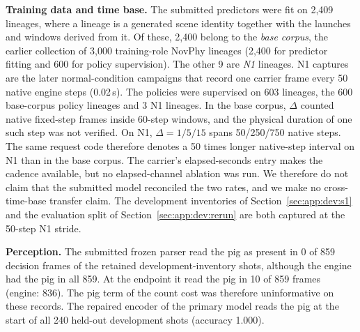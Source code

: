 \begin{revblock}
\textbf{Training data and time base.} The submitted predictors were fit on 2,409 lineages, where a lineage is a generated scene identity together with the launches and windows derived from it. Of these, 2,400 belong to the \emph{base corpus}, the earlier collection of 3,000 training-role NovPhy lineages (2,400 for predictor fitting and 600 for policy supervision). The other 9 are \emph{N1} lineages. N1 captures are the later normal-condition campaigns that record one carrier frame every 50 native engine steps (0.02\,s). The policies were supervised on 603 lineages, the 600 base-corpus policy lineages and 3 N1 lineages. In the base corpus, $\Delta$ counted native fixed-step frames inside 60-step windows, and the physical duration of one such step was not verified. On N1, $\Delta=1/5/15$ spans 50/250/750 native steps. The same request code therefore denotes a 50 times longer native-step interval on N1 than in the base corpus. The carrier's elapsed-seconds entry makes the cadence available, but no elapsed-channel ablation was run. We therefore do not claim that the submitted model reconciled the two rates, and we make no cross-time-base transfer claim. The development inventories of Section~\ref{sec:app:dev:s1} and the evaluation split of Section~\ref{sec:app:dev:rerun} are both captured at the 50-step N1 stride.

\textbf{Perception.} The submitted frozen parser read the pig as present in 0 of 859 decision frames of the retained development-inventory shots, although the engine had the pig in all 859. At the endpoint it read the pig in 10 of 859 frames (engine: 836). The pig term of the count cost was therefore uninformative on these records. The repaired encoder of the primary model reads the pig at the start of all 240 held-out development shots (accuracy 1.000).
\end{revblock}

\subsubsection{\texorpdfstring{}{Withdrawn Compute Comparison}}
\label{sec:app:dev:compute}

